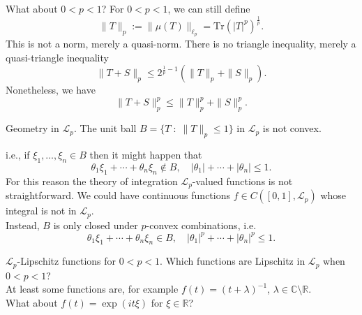 \documentclass{beamer}
\numberwithin{equation}{section}
\theoremstyle{plain}
\theoremstyle{plain}
\theoremstyle{definition}
\theoremstyle{plain}
\theoremstyle{plain}
\theoremstyle{definition}
\newcommand{\Rl}{\mathbb{R}}
\newcommand{\Cplx}{\mathbb{C}}
\newcommand{\Lc}{\mathcal{L}}
\newcommand{\Tr}{\mathrm{Tr}}
\begin{document}
\begin{frame}{What about $0 < p < 1$?}
    For $0 < p < 1$, we can still define
    $$
        \|T\|_p := \|\mu(T)\|_{\ell_p} = \Tr(|T|^p)^{\frac1p}.
    $$
    This is not a norm, merely a quasi-norm. There is no triangle inequality, merely a quasi-triangle inequality
    $$
        \|T+S\|_p \leq 2^{\frac1p-1}(\|T\|_p+\|S\|_p).
    $$
    \pause
    Nonetheless, we have
    \[
        \|T+S\|_p^p \leq \|T\|_p^p+\|S\|_p^p.
    \]
\end{frame}


\begin{frame}{Geometry in $\Lc_p.$}
    The unit ball $B = \{T\;:\; \|T\|_p\leq 1\}$ in $\Lc_p$ is not convex.

    i.e., if $\xi_1,\ldots,\xi_n\in B$ then it might happen that
    \[
        \theta_1\xi_1+\cdots+\theta_n\xi_n\notin B,\quad |\theta_1|+\cdots+|\theta_n|\leq 1.
    \]
    For this reason the theory of integration $\Lc_p$-valued functions is not straightforward. We could have continuous functions $f \in C([0,1],\Lc_p)$
    whose integral is not in $\Lc_p.$\\
    \pause
    Instead, $B$ is only closed under $p$-convex combinations, i.e.
    \[
        \theta_1\xi_1+\cdots+\theta_n \xi_n \in B,\quad |\theta_1|^p+\cdots+|\theta_n|^p \leq 1.
    \]
\end{frame}


\begin{frame}{$\Lc_p$-Lipschitz functions for $0 < p < 1.$}
    Which functions are Lipschitz in $\Lc_p$ when $0 < p < 1$? \\
    \pause
    At least some functions are, for example $f(t) = (t+\lambda)^{-1}$, $\lambda \in \Cplx\setminus \Rl.$\\
    \pause
    What about $f(t) = \exp(it\xi)$ for $\xi\in \Rl$?
\end{frame}
\end{document}

